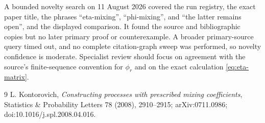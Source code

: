 \documentclass[11pt]{article}
\begin{document}
A bounded novelty search on 11 August 2026 covered the run registry, the exact
paper title, the phrases ``eta-mixing'', ``phi-mixing'', and ``the latter
remains open'', and the displayed comparison.  It found the source and
bibliographic copies but no later primary proof or counterexample.  A broader
primary-source query timed out, and no complete citation-graph sweep was
performed, so novelty confidence is moderate.  Specialist review should focus
on agreement with the source's finite-sequence convention for $\phi_r$ and on
the exact calculation \eqref{eq:eta-matrix}.

\begin{thebibliography}{9}
L. Kontorovich,
\emph{Constructing processes with prescribed mixing coefficients},
Statistics \& Probability Letters 78 (2008), 2910--2915;
arXiv:0711.0986; doi:10.1016/j.spl.2008.04.016.
\end{thebibliography}
\end{document}
